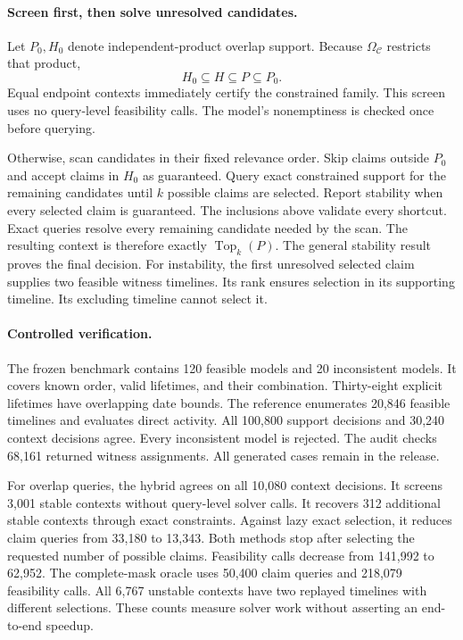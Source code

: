\paragraph{Screen first, then solve unresolved candidates.}
Let $P_0,H_0$ denote independent-product overlap support.
Because $\Omega_{\mathcal C}$ restricts that product,
\[
 H_0\subseteq H\subseteq P\subseteq P_0.
\]
Equal endpoint contexts immediately certify the constrained family.
This screen uses no query-level feasibility calls.
The model's nonemptiness is checked once before querying.

Otherwise, scan candidates in their fixed relevance order.
Skip claims outside $P_0$ and accept claims in $H_0$ as guaranteed.
Query exact constrained support for the remaining candidates until $k$ possible claims are selected.
Report stability when every selected claim is guaranteed.
The inclusions above validate every shortcut.
Exact queries resolve every remaining candidate needed by the scan.
The resulting context is therefore exactly $\operatorname{Top}_k(P)$.
The general stability result proves the final decision.
For instability, the first unresolved selected claim supplies two feasible witness timelines.
Its rank ensures selection in its supporting timeline.
Its excluding timeline cannot select it.

\paragraph{Controlled verification.}
The frozen benchmark contains 120 feasible models and 20 inconsistent models.
It covers known order, valid lifetimes, and their combination.
Thirty-eight explicit lifetimes have overlapping date bounds.
The reference enumerates 20,846 feasible timelines and evaluates direct activity.
All 100,800 support decisions and 30,240 context decisions agree.
Every inconsistent model is rejected.
The audit checks 68,161 returned witness assignments.
All generated cases remain in the release.

For overlap queries, the hybrid agrees on all 10,080 context decisions.
It screens 3,001 stable contexts without query-level solver calls.
It recovers 312 additional stable contexts through exact constraints.
Against lazy exact selection, it reduces claim queries from 33,180 to 13,343.
Both methods stop after selecting the requested number of possible claims.
Feasibility calls decrease from 141,992 to 62,952.
The complete-mask oracle uses 50,400 claim queries and 218,079 feasibility calls.
All 6,767 unstable contexts have two replayed timelines with different selections.
These counts measure solver work without asserting an end-to-end speedup.

